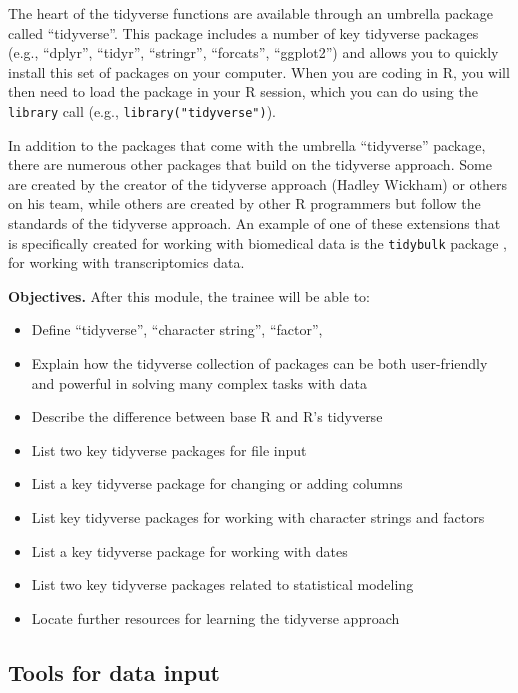 \documentclass[]{tufte-book}
\providecommand{\tightlist}{%
  \setlength{\itemsep}{0pt}\setlength{\parskip}{0pt}}
\begin{document}
The heart of the tidyverse functions are available through an umbrella
package called ``tidyverse''. This package includes a number of key tidyverse
packages (e.g., ``dplyr'', ``tidyr'', ``stringr'', ``forcats'', ``ggplot2'') and allows you
to quickly install this set of packages on your computer. When you are coding
in R, you will then need to load the package in your R session, which you can
do using the \texttt{library} call (e.g., \texttt{library("tidyverse")}).

In addition to the packages that come with the umbrella ``tidyverse'' package,
there are numerous other packages that build on the tidyverse approach.
Some are created by the creator of the tidyverse approach (Hadley Wickham)
or others on his team, while others are created by other R programmers but
follow the standards of the tidyverse approach. An example of one of
these extensions that is specifically created for working with biomedical data
is the \texttt{tidybulk} package \citep{mangiola2021tidybulk}, for working with
transcriptomics data.

\textbf{Objectives.} After this module, the trainee will be able to:

\begin{itemize}
\tightlist
\item
  Define ``tidyverse'', ``character string'', ``factor'',
\item
  Explain how the tidyverse collection of packages can be both user-friendly
  and powerful in solving many complex tasks with data
\item
  Describe the difference between base R and R's tidyverse
\item
  List two key tidyverse packages for file input
\item
  List a key tidyverse package for changing or adding columns
\item
  List key tidyverse packages for working with character strings and factors
\item
  List a key tidyverse package for working with dates
\item
  List two key tidyverse packages related to statistical modeling
\item
  Locate further resources for learning the tidyverse approach
\end{itemize}

\subsection{Tools for data input}\label{tools-for-data-input}
\end{document}
